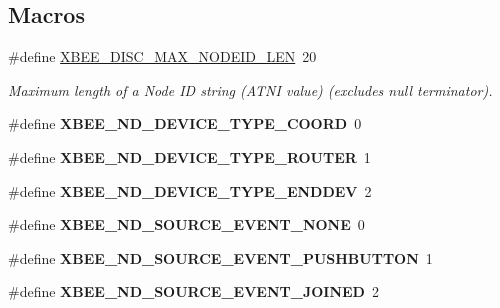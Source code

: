 \subsection*{Macros}
\begin{DoxyCompactItemize}
\item 
\mbox{\label{group__xbee__discovery_ga0df6e63d6ccca22fcf154b6f0be46da6}} 
\#define \hyperlink{group__xbee__discovery_ga0df6e63d6ccca22fcf154b6f0be46da6}{X\+B\+E\+E\+\_\+\+D\+I\+S\+C\+\_\+\+M\+A\+X\+\_\+\+N\+O\+D\+E\+I\+D\+\_\+\+L\+EN}~20
\begin{DoxyCompactList}\small\item\em Maximum length of a Node ID string (A\+T\+NI value) (excludes null terminator). \end{DoxyCompactList}\item 
\mbox{\label{group__xbee__discovery_gad01a0deb6da2cfa51bf893b93c33145b}} 
\#define {\bfseries X\+B\+E\+E\+\_\+\+N\+D\+\_\+\+D\+E\+V\+I\+C\+E\+\_\+\+T\+Y\+P\+E\+\_\+\+C\+O\+O\+RD}~0
\item 
\mbox{\label{group__xbee__discovery_ga7b5f045986178759d39b922d9671ef58}} 
\#define {\bfseries X\+B\+E\+E\+\_\+\+N\+D\+\_\+\+D\+E\+V\+I\+C\+E\+\_\+\+T\+Y\+P\+E\+\_\+\+R\+O\+U\+T\+ER}~1
\item 
\mbox{\label{group__xbee__discovery_ga1d539a23a1b7f387256a706825b2ba01}} 
\#define {\bfseries X\+B\+E\+E\+\_\+\+N\+D\+\_\+\+D\+E\+V\+I\+C\+E\+\_\+\+T\+Y\+P\+E\+\_\+\+E\+N\+D\+D\+EV}~2
\item 
\mbox{\label{group__xbee__discovery_ga65247596c3705407f5f2eb73497ef5ca}} 
\#define {\bfseries X\+B\+E\+E\+\_\+\+N\+D\+\_\+\+S\+O\+U\+R\+C\+E\+\_\+\+E\+V\+E\+N\+T\+\_\+\+N\+O\+NE}~0
\item 
\mbox{\label{group__xbee__discovery_gafe8894115d7013fb820444fa2c77a12a}} 
\#define {\bfseries X\+B\+E\+E\+\_\+\+N\+D\+\_\+\+S\+O\+U\+R\+C\+E\+\_\+\+E\+V\+E\+N\+T\+\_\+\+P\+U\+S\+H\+B\+U\+T\+T\+ON}~1
\item 
\mbox{\label{group__xbee__discovery_gad3637e6febeec639fd9750c40a6e7a7f}} 
\#define {\bfseries X\+B\+E\+E\+\_\+\+N\+D\+\_\+\+S\+O\+U\+R\+C\+E\+\_\+\+E\+V\+E\+N\+T\+\_\+\+J\+O\+I\+N\+ED}~2

\end{DoxyCompactItemize}
